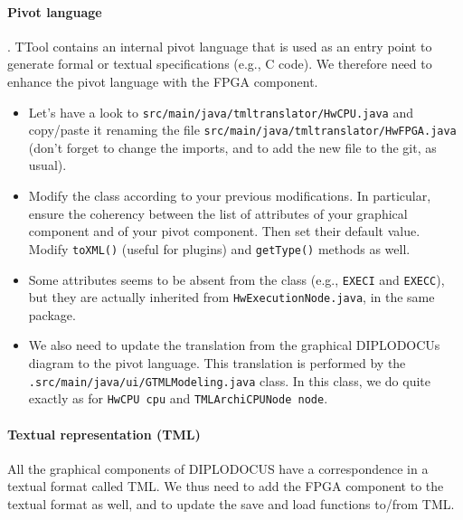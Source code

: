 \documentclass[12pt]{article}
\begin{document}
\paragraph{Pivot language}.  TTool contains an internal pivot language that is used as an entry point to generate formal or textual specifications (e.g., C code). We therefore need to enhance the pivot language with the FPGA component.

\begin{itemize}
\item Let's have a look to \texttt{src/main/java/tmltranslator/HwCPU.java} and copy/paste it renaming the file \texttt{src/main/java/tmltranslator/HwFPGA.java} (don't forget to change the imports, and to add the new file to the git, as usual).

\item Modify the class according to your previous modifications. In particular, ensure the coherency between the list of attributes of your graphical component and of your pivot component. Then set their default value. Modify \texttt{toXML()} (useful for plugins) and \texttt{getType()} methods as well. 

\item Some attributes seems to be absent from the class  (e.g., \texttt{EXECI} and \texttt{EXECC}), but they are actually inherited from  \texttt{HwExecutionNode.java}, in the same package.

\item We also need to update the translation from the graphical DIPLODOCUs diagram to the pivot language. This translation is performed by the \texttt{.src/main/java/ui/GTMLModeling.java} class. In this class, we do quite exactly as for  \texttt{HwCPU cpu} and \texttt{TMLArchiCPUNode node}.
\end{itemize}


\paragraph{Textual representation (TML)} All the graphical components of DIPLODOCUS have a correspondence in  a textual format called TML. We thus need to add the FPGA component to the textual format as well, and to update the save and load functions to/from TML.
\end{document}
